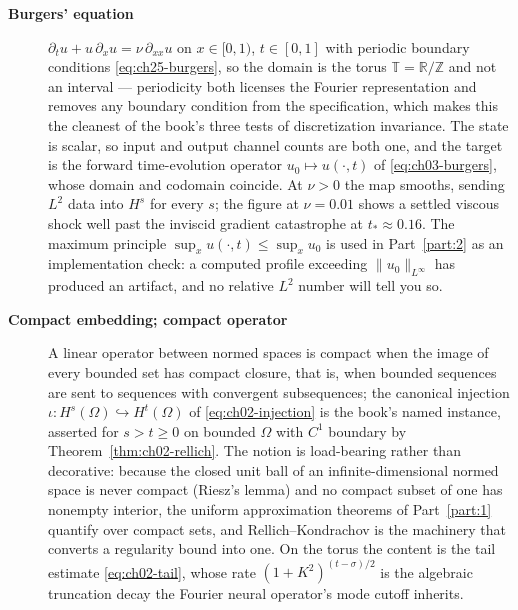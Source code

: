 \begin{description}
\item[\textbf{Burgers' equation}] $\partial_{t} u + u\,\partial_{x} u =
\nu\,\partial_{xx} u$ on $x \in [0,1)$, $t \in [0,1]$ with periodic boundary
conditions \eqref{eq:ch25-burgers}, so the domain is the torus
$\mathbb{T} = \mathbb{R}/\mathbb{Z}$ and not an interval --- periodicity both
licenses the Fourier representation and removes any boundary condition from the
specification, which makes this the cleanest of the book's three tests of
discretization invariance. The state is scalar, so input and output channel counts
are both one, and the target is the forward time-evolution operator
$u_{0} \mapsto u(\cdot, t)$ of \eqref{eq:ch03-burgers}, whose domain and codomain
coincide. At $\nu > 0$ the map smooths, sending $L^{2}$ data into $H^{s}$ for every
$s$; the figure at $\nu = 0.01$ shows a settled viscous shock well past the inviscid
gradient catastrophe at $t_{*} \approx 0.16$. The maximum principle
$\sup_{x} u(\cdot, t) \le \sup_{x} u_{0}$ is used in Part~\ref{part:2} as an
implementation check: a computed profile exceeding $\|u_{0}\|_{L^{\infty}}$ has
produced an artifact, and no relative $L^{2}$ number will tell you so.

\item[\textbf{Compact embedding; compact operator}] A linear operator between normed
spaces is compact when the image of every bounded set has compact closure, that
is, when bounded sequences are sent to sequences with convergent subsequences; the canonical injection
$\iota : H^{s}(\Omega) \hookrightarrow H^{t}(\Omega)$ of
\eqref{eq:ch02-injection} is the book's named instance, asserted for $s > t \ge 0$
on bounded $\Omega$ with $C^{1}$ boundary by Theorem~\ref{thm:ch02-rellich}. The
notion is load-bearing rather than decorative: because the closed unit ball of an
infinite-dimensional normed space is never compact (Riesz's lemma) and no compact
subset of one has nonempty interior, the uniform approximation theorems of
Part~\ref{part:1} quantify over compact sets, and Rellich--Kondrachov is the
machinery that converts a regularity bound into one. On the torus the content is the
tail estimate \eqref{eq:ch02-tail}, whose rate $(1+K^{2})^{(t-\sigma)/2}$ is the
algebraic truncation decay the Fourier neural operator's mode cutoff inherits.


\end{description}
